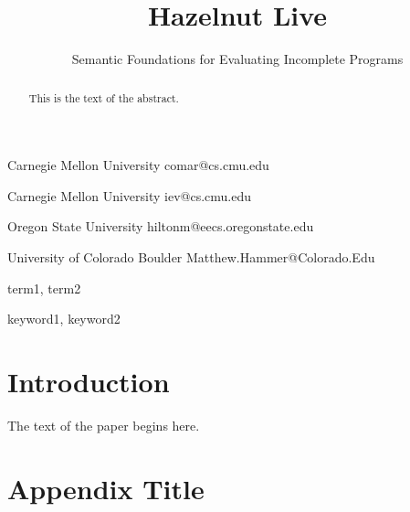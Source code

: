 \documentclass[preprint]{sigplanconf}
\begin{document}
\setlength{\pdfpageheight}{\paperheight}
\setlength{\pdfpagewidth}{\paperwidth}




\title{Hazelnut Live}
\subtitle{Semantic Foundations for Evaluating Incomplete Programs}

           {Carnegie Mellon University}
           {comar@cs.cmu.edu}

           {Carnegie Mellon University}
           {iev@cs.cmu.edu}

           {Oregon State University}
           {hiltonm@eecs.oregonstate.edu}

           {University of Colorado Boulder}
           {Matthew.Hammer@Colorado.Edu}

\maketitle

\begin{abstract}
This is the text of the abstract.
\end{abstract}


\terms
term1, term2

\keywords
keyword1, keyword2

\section{Introduction}

The text of the paper begins here.

\appendix
\section{Appendix Title}
\end{document}
